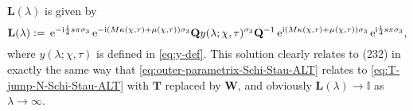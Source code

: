 $\mathbf{L}(\lambda)$ is given by
\begin{equation}
\mathbf{L}(\lambda)\vcentcolon= 
\,\mathrm{e}^{-\mathrm{i} \frac{1}{4}s \pi \sigma_3}
\,\mathrm{e}^{-\mathrm{i} (M\kappa(\chi,\tau) + \mu(\chi,\tau) )\sigma_3}
\mathbf{Q}y(\lambda;\chi,\tau)^{\sigma_3}\mathbf{Q}^{-1}
\,\mathrm{e}^{\mathrm{i} (M\kappa(\chi,\tau)+  \mu(\chi,\tau) )\sigma_3}
\,\mathrm{e}^{\mathrm{i} \frac{1}{4}s \pi \sigma_3},
\label{eq:H-def}
\end{equation}
where $y(\lambda;\chi,\tau)$ is defined in \eqref{eq:y-def}.
This solution clearly relates to (232) in exactly the same way that \eqref{eq:outer-parametrix-Schi-Stau-ALT} relates to \eqref{eq:T-jump-N-Schi-Stau-ALT} with $\mathbf{T}$ replaced by $\mathbf{W}$, and obviously $\mathbf{L}(\lambda)\to\mathbb{I}$ as $\lambda\to\infty$.
